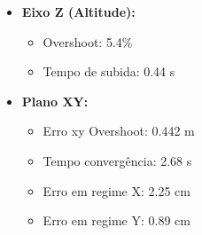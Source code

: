 \begin{itemize}
  \item \textbf{Eixo Z (Altitude):}
  \begin{itemize}
    \item Overshoot: 5.4\%
    \item Tempo de subida: 0.44 s
  \end{itemize}
  \item \textbf{Plano XY:}
  \begin{itemize}
    \item Erro xy Overshoot: 0.442 m
    \item Tempo convergência: 2.68 s
    \item Erro em regime X: 2.25 cm
    \item Erro em regime Y: 0.89 cm
  \end{itemize}
\end{itemize}
